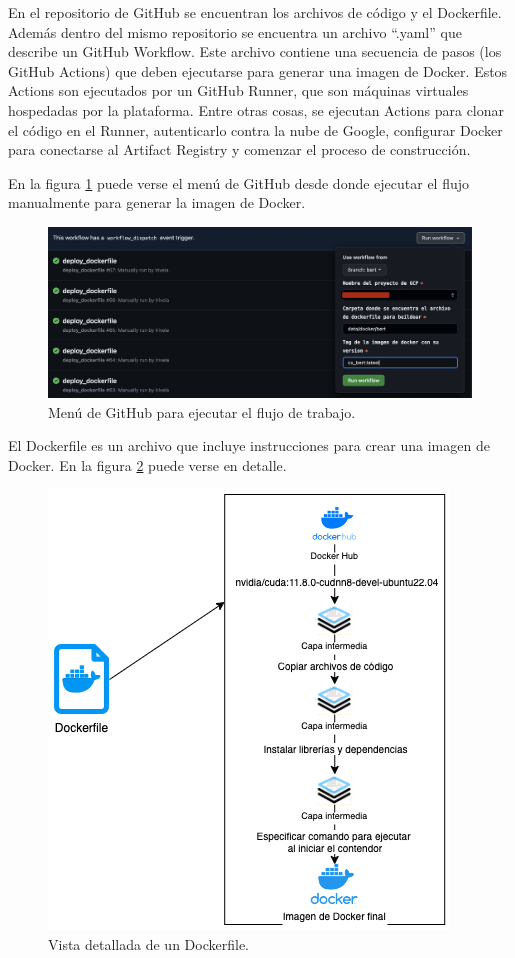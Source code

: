 En el repositorio de GitHub se encuentran los archivos de código y el Dockerfile. Además dentro del mismo repositorio se encuentra un archivo ``.yaml'' que describe un GitHub Workflow. Este archivo contiene una secuencia de pasos (los GitHub Actions) que deben ejecutarse para generar una imagen de Docker. Estos Actions son ejecutados por un GitHub Runner, que son máquinas virtuales hospedadas por la plataforma. Entre otras cosas, se ejecutan Actions para clonar el código en el Runner, autenticarlo contra la nube de Google, configurar Docker para conectarse al Artifact Registry y comenzar el proceso de construcción.

En la figura \ref{fig:cap3-gh-docker} puede verse el menú de GitHub desde donde ejecutar el flujo manualmente para generar la imagen de Docker.

\begin{figure}[htbp]
	\centering
	\includegraphics[width=.8\textwidth]{./Figures/cap3-gh-docker.png}
	\caption{Menú de GitHub para ejecutar el flujo de trabajo.}
	\label{fig:cap3-gh-docker}
\end{figure}

El Dockerfile es un archivo que incluye instrucciones para crear una imagen de Docker. En la figura \ref{fig:cap3-docker-dockerfile} puede verse en detalle.

\begin{figure}[htbp]
	\centering
	\includegraphics[width=.6\textwidth]{./Figures/cap3-docker-dockerfile.png}
	\caption{Vista detallada de un Dockerfile.}
	\label{fig:cap3-docker-dockerfile}
\end{figure}

